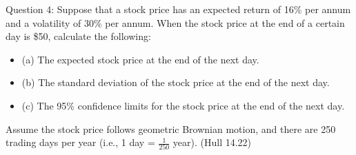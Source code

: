 \documentclass[12pt,letterpaper,onecolumn]{exam}
\begin{document}
\newpage


\begin{question}{Question 4:}
Suppose that a stock price has an expected return of 16\% per annum and a volatility of 30\% per annum. When the stock price at the end of a certain day is \$50, calculate the following:
\begin{itemize}
    \item (a) The expected stock price at the end of the next day.
    \item (b) The standard deviation of the stock price at the end of the next day.
    \item (c) The 95\% confidence limits for the stock price at the end of the next day.
\end{itemize}
Assume the stock price follows geometric Brownian motion, and there are 250 trading days per year (i.e., 1 day = \( \frac{1}{250} \) year). (Hull 14.22)
\end{question}
\end{document}
